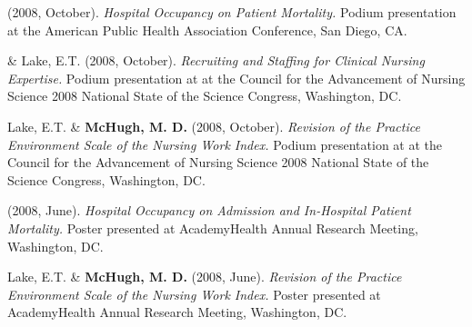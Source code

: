 \documentclass[10pt,]{article}
\begin{document}
{{{{{{{{{{{{{{\begin{hangparas}{.25in}{1}
\end{hangparas}

\vspace{4mm}

\begin{hangparas}{.25in}{1}

 (2008, October). {\textit {Hospital Occupancy on Patient Mortality.}} Podium presentation at the American Public Health Association Conference, San Diego, CA.

\end{hangparas}

\vspace{4mm}

\begin{hangparas}{.25in}{1}

 \& Lake, E.T. (2008, October). {\textit {Recruiting and Staffing for Clinical Nursing Expertise.}} Podium presentation at at the Council for the Advancement of Nursing Science 2008 National State of the Science Congress, Washington, DC.

\end{hangparas}

\vspace{4mm}

\begin{hangparas}{.25in}{1}

\*Lake, E.T. \& {\textbf {McHugh, M. D.}} (2008, October). {\textit {Revision of the Practice Environment Scale of the Nursing Work Index.}} Podium presentation at at the Council for the Advancement of Nursing Science 2008 National State of the Science Congress, Washington, DC.

\end{hangparas}

\vspace{4mm}

\begin{hangparas}{.25in}{1}

 (2008, June). {\textit {Hospital Occupancy on Admission and In-Hospital Patient Mortality.}} Poster presented at AcademyHealth Annual Research Meeting, Washington, DC.

\end{hangparas}

\vspace{4mm}

\begin{hangparas}{.25in}{1}

\*Lake, E.T. \& {\textbf {McHugh, M. D.}} (2008, June). {\textit {Revision of the Practice Environment Scale of the Nursing Work Index.}} Poster presented at AcademyHealth Annual Research Meeting, Washington, DC.


\end{hangparas}}}}}}}}}}}}}}}
\end{document}
